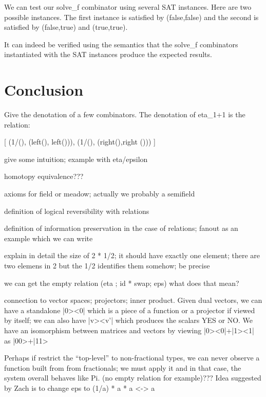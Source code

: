 \documentclass{llncs}
\begin{document}
We can test our {{solve_f}} combinator using several SAT
instances. Here are two possible instances. The first instance is
satisfied by {{(false,false)}} and the
second is satisfied by {{(false,true)}} and {{(true,true)}}.

% 

It can indeed be verified using the semantics that the {{solve_f}}
combinators instantiated with the SAT instances produce the expected
results. 

\section{Conclusion}

Give the denotation of a few combinators. The denotation of {{eta_{1+1} }} is
the relation:

{{ {[ (1/(), (left(), left())), (1/(), (right(),right ())) ]} }}

give some intuition; example with eta/epsilon

homotopy equivalence???

axioms for field or meadow; actually we probably a semifield

definition of logical reversibility with relations

definition of information preservation in the case of relations; fanout as an
example which we can write

explain in detail the size of 2 * 1/2; it should have exactly one element;
there are two elemens in 2 but the 1/2 identifies them somehow; be precise

we can get the empty relation (eta ; id * swap; eps) what does that mean? 

connection to vector spaces; projectors; inner product. Given dual vectors,
we can have a standalone |0><0| which is a piece of a function or a projector
if viewed by itself; we can also have |v><v'| which produces the scalars YES
or NO. We have an isomorphism between matrices and vectors by viewing 
|0><0|+|1><1| as |00>+|11>

Perhaps if restrict the ``top-level'' to non-fractional types, we can never
observe a function built from from fractionals; we must apply it and in that
case, the system overall behaves like Pi. (no empty relation for example)???
Idea suggested by Zach is to change eps to (1/a) * a * a <-> a
\end{document}
